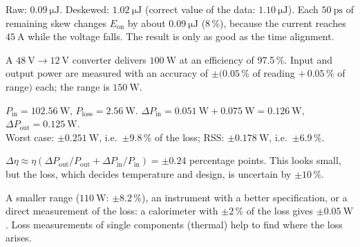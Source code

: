 
\begin{solutionblock}
	Raw: $\SI{0.09}{\micro\joule}$. Deskewed: $\SI{1.02}{\micro\joule}$ (correct value of the data: $\SI{1.10}{\micro\joule}$). Each $\SI{50}{\pico\second}$ of remaining skew changes $E_\mathrm{on}$ by about $\SI{0.09}{\micro\joule}$ (8\,\%), because the current reaches $\SI{45}{\ampere}$ while the voltage falls. The result is only as good as the time alignment.
\end{solutionblock}



A $\SI{48}{\volt}\rightarrow\SI{12}{\volt}$ converter delivers $\SI{100}{\watt}$ at an efficiency of 97.5\,\%. Input and output power are measured with an accuracy of $\pm(0.05\,\%$ of reading $+\,0.05\,\%$ of range$)$ each; the range is $\SI{150}{\watt}$.


\begin{solutionblock}
	$P_\mathrm{in}=\SI{102.56}{\watt}$, $P_\mathrm{loss}=\SI{2.56}{\watt}$. $\Delta P_\mathrm{in}=\SI{0.051}{\watt}+\SI{0.075}{\watt}=\SI{0.126}{\watt}$, $\Delta P_\mathrm{out}=\SI{0.125}{\watt}$.\\
	Worst case: $\pm\SI{0.251}{\watt}$, i.e.\ $\pm9.8\,\%$ of the loss; RSS: $\pm\SI{0.178}{\watt}$, i.e.\ $\pm6.9\,\%$.
\end{solutionblock}


\begin{solutionblock}
	$\Delta\eta\approx\eta\left(\Delta P_\mathrm{out}/P_\mathrm{out}+\Delta P_\mathrm{in}/P_\mathrm{in}\right)=\pm0.24$ percentage points. This looks small, but the loss, which decides temperature and design, is uncertain by $\pm10\,\%$.
\end{solutionblock}


\begin{solutionblock}
	A smaller range ($\SI{110}{\watt}$: $\pm8.2\,\%$), an instrument with a better specification, or a direct measurement of the loss: a calorimeter with $\pm2\,\%$ of the loss gives $\pm\SI{0.05}{\watt}$. Loss measurements of single components (thermal) help to find where the loss arises.
\end{solutionblock}

